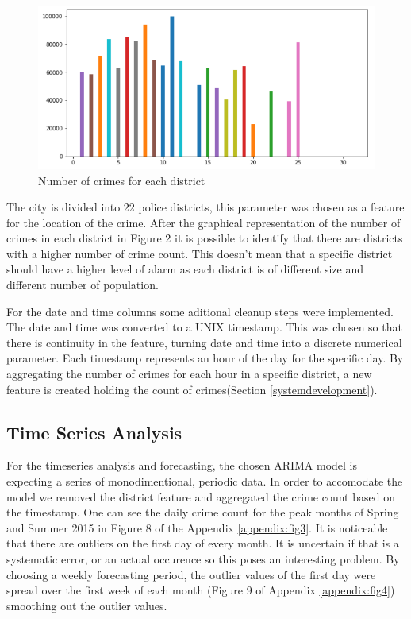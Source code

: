 \documentclass[a4paper, twocolumn]{article}
\begin{document}
\begin{figure}
    \includegraphics[scale=0.3]{fig2.png}
    \caption{Number of crimes for each district}
\end{figure}
The city is divided into 22 police districts, this parameter was chosen as a feature for the location of the crime.
After the graphical representation of the number of crimes in each district in Figure 2
it is possible to identify that there are districts with a higher number of crime count. 
This doesn’t mean that a specific district should have a higher level of alarm as each district is of different size and different number of population.

For the date and time columns some aditional cleanup steps were implemented. 
The date and time was converted to a UNIX timestamp. This was chosen so that there is continuity in the feature, turning date and time into a discrete numerical parameter.  
Each timestamp represents an hour of the day for the specific day.
By aggregating the number of crimes for each hour in a specific district, a new feature is created holding the count of crimes(Section \ref{systemdevelopment}).

\subsection{Time Series Analysis}
For the timeseries analysis and forecasting, the chosen ARIMA model is expecting a series of monodimentional, periodic data. 
In order to accomodate the model we removed the district feature and aggregated the crime count based on the timestamp.
One can see the daily crime count for the peak months of Spring and Summer 2015 
in Figure 8 of the Appendix \ref{appendix:fig3}. 
It is noticeable that there are outliers on the first day of every month. 
It is uncertain if that is a systematic error, or an actual occurence so this poses an interesting problem. 
By choosing a weekly forecasting period, the outlier values of the first day were spread over the first week of each month 
(Figure 9 of Appendix \ref{appendix:fig4}) smoothing out the outlier values.
\end{document}
